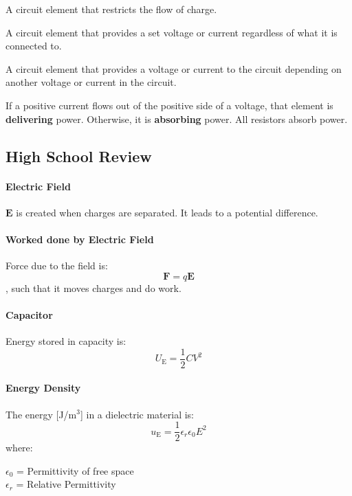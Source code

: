 \documentclass[11pt]{article}
\begin{document}
    \begin{definition}[Resistors]
    A circuit element that restricts the flow of charge.
    \end{definition}
    
    \begin{definition}
    A circuit element that provides a set voltage or current regardless of what it is connected to.
    \end{definition}
    
    \begin{definition}
    A circuit element that provides a voltage or current to the circuit depending on another voltage or current in the circuit.
    \end{definition}
    
    \begin{definition}
    If a positive current flows out of the positive side of a voltage, that element is \textbf{delivering} power. Otherwise, it is \textbf{absorbing} power. All resistors absorb power.
    \end{definition}
\subsection{High School Review}
\paragraph{Electric Field} $\textbf{E}$ is created when charges are separated. It leads to a potential difference.
\paragraph{Worked done by Electric Field} Force due to the field is:
\begin{equation}
    \textbf{F} = q\textbf{E}
\end{equation}
, such that it moves charges and do work.
\paragraph{Capacitor} Energy stored in capacity is:
\begin{equation}
    U_\text{E} = \frac{1}{2}CV^2
\end{equation}
\paragraph{Energy Density} The energy [J/m$^3$] in a dielectric material is:
\begin{equation}
    u_\text{E} = \frac{1}{2}\epsilon_r \epsilon_0 E^2
\end{equation}
where:
\begin{center}
    $\epsilon_0$ = Permittivity of free space \\
    $\epsilon_r$ = Relative Permittivity
\end{center}
\end{document}
